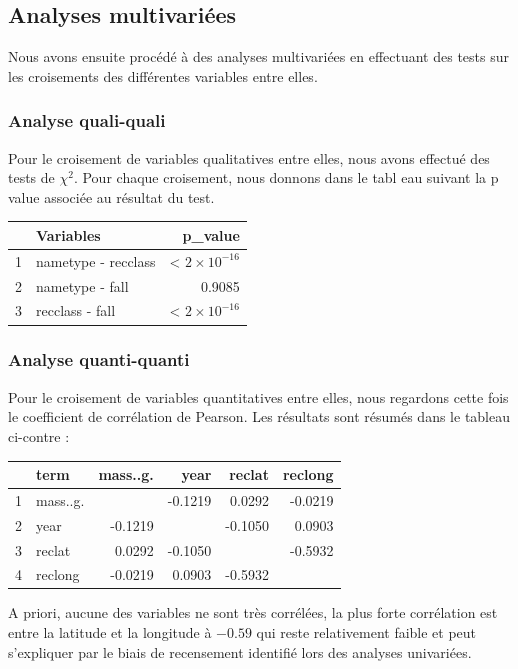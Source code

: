 \documentclass[12pt]{article}
\begin{document}
\subsection{Analyses multivariées}
Nous avons ensuite procédé à des analyses multivariées en effectuant des tests sur les croisements des différentes variables entre elles.
\subsubsection*{Analyse quali-quali}
Pour le croisement de variables qualitatives entre elles, nous avons effectué des tests de $\chi^2$. Pour chaque croisement, nous donnons dans le tabl eau suivant la p value associée au résultat du test.
\begin{table}[H]
\centering
\begin{tabular}{rlr}
  \hline
 & Variables & p\_value \\ 
  \hline
1 & nametype - recclass & < $2\times 10^{-16}$  \\ 
  2 & nametype - fall & 0.9085 \\ 
  3 & recclass - fall & < $2\times 10^{-16}$  \\ 
   \hline
\end{tabular}
\end{table}
\subsubsection*{Analyse quanti-quanti}
Pour le croisement de variables quantitatives entre elles, nous regardons cette fois le coefficient de corrélation de Pearson. Les résultats sont résumés dans le tableau ci-contre :
\begin{table}[H]
\centering
\begin{tabular}{rlrrrr}
  \hline
 & term & mass..g. & year & reclat & reclong \\ 
  \hline
1 & mass..g. &  & -0.1219 & 0.0292 & -0.0219 \\ 
  2 & year & -0.1219 &  & -0.1050 & 0.0903 \\ 
  3 & reclat & 0.0292 & -0.1050 &  & -0.5932 \\ 
  4 & reclong & -0.0219 & 0.0903 & -0.5932 &  \\ 
   \hline
\end{tabular}
\end{table}
A priori, aucune des variables ne sont très corrélées, la plus forte corrélation est entre la latitude et la longitude à $-0.59$ qui reste relativement faible et peut s'expliquer par le biais de recensement identifié lors des analyses univariées.
\end{document}
